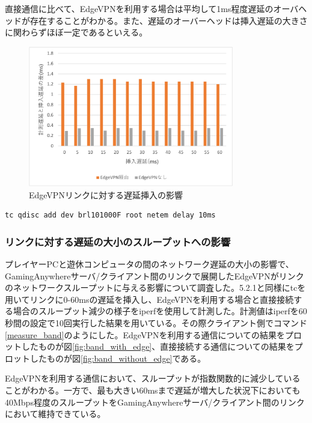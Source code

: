 直接通信に比べて、EdgeVPNを利用する場合は平均して1ms程度遅延のオーバヘッドが存在することがわかる。また、遅延のオーバーヘッドは挿入遅延の大きさに関わらずほぼ一定であるといえる。

\begin{figure}[t]
    \centering
    \includegraphics[width=0.8\textwidth,keepaspectratio,clip]{img/graph_ratency.pdf}
    \caption{EdgeVPNリンクに対する遅延挿入の影響}
    \label{fig:ratency}
\end{figure}

\begin{lstlisting}[caption=遅延挿入,label=add_ratency]
    tc qdisc add dev brl101000F root netem delay 10ms
\end{lstlisting}

\subsubsection{リンクに対する遅延の大小のスループットへの影響}
プレイヤーPCと遊休コンピュータの間のネットワーク遅延の大小の影響で、GamingAnywhereサーバ/クライアント間のリンクで展開したEdgeVPNがリンクのネットワークスループットに与える影響について調査した。5.2.1と同様にtcを用いてリンクに0-60msの遅延を挿入し、EdgeVPNを利用する場合と直接接続する場合のスループット減少の様子をiperf\cite{iperf}を使用して計測した。計測値はiperfを60秒間の設定で10回実行した結果を用いている。その際クライアント側でコマンド\ref{measure_band}のようにした。EdgeVPNを利用する通信についての結果をプロットしたものが図\ref{fig:band_with_edge}、直接接続する通信についての結果をプロットしたものが図\ref{fig:band_without_edge}である。

EdgeVPNを利用する通信において、スループットが指数関数的に減少していることがわかる。一方で、最も大きい60msまで遅延が増大した状況下においても40Mbps程度のスループットをGamingAnywhereサーバ/クライアント間のリンクにおいて維持できている。

